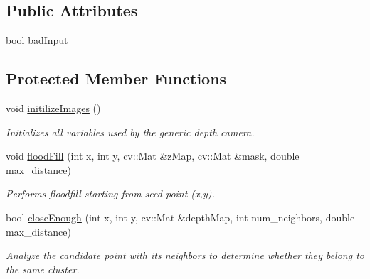 \subsection*{Public Attributes}
\begin{DoxyCompactItemize}
\item 
bool \hyperlink{class_depth_camera_a28f1ed73b3be887b3da06334416ac91a}{bad\+Input}
\end{DoxyCompactItemize}
\subsection*{Protected Member Functions}
\begin{DoxyCompactItemize}
\item 
void \hyperlink{class_depth_camera_a02f2fbde7cf4a340ace92278c89c66ef}{initilize\+Images} ()
\begin{DoxyCompactList}\small\item\em Initializes all variables used by the generic depth camera. \end{DoxyCompactList}\item 
void \hyperlink{class_depth_camera_acebcf84d24ce5bfd0b1392547dc79eb1}{flood\+Fill} (int x, int y, cv\+::\+Mat \&z\+Map, cv\+::\+Mat \&mask, double max\+\_\+distance)
\begin{DoxyCompactList}\small\item\em Performs floodfill starting from seed point (x,y). \end{DoxyCompactList}\item 
bool \hyperlink{class_depth_camera_ab24ac78c2cf29b0410c3d5e0dfc9a243}{close\+Enough} (int x, int y, cv\+::\+Mat \&depth\+Map, int num\+\_\+neighbors, double max\+\_\+distance)
\begin{DoxyCompactList}\small\item\em Analyze the candidate point with its neighbors to determine whether they belong to the same cluster. \end{DoxyCompactList}\end{DoxyCompactItemize}
